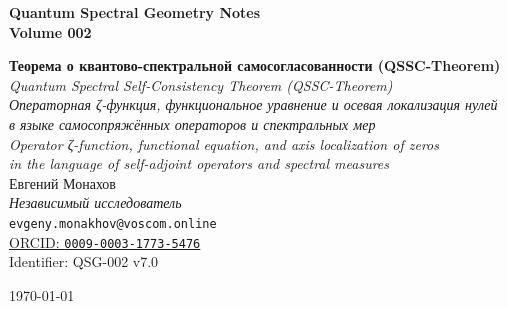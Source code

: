 \documentclass{article}
\numberwithin{equation}{section}
\theoremstyle{plain}
\theoremstyle{definition}
\theoremstyle{remark}
\begin{document}
    \sloppy

\begin{titlepage}
    \centering

    {\Large\textbf{Quantum Spectral Geometry Notes}}\\[4pt]
    {\large\textbf{Volume 002}}\\[16pt]
    
    \vspace*{\fill}

    {\Large\textbf{
    Теорема о квантово-спектральной самосогласованности (QSSC-Theorem)
    }}\\[12pt]

    {\large\textit{
    Quantum Spectral Self-Consistency Theorem (QSSC-Theorem)
    }}\\[20pt]

    {\normalsize\textit{
    Операторная ζ-функция, функциональное уравнение и осевая локализация нулей\\
    в языке самосопряжённых операторов и спектральных мер
    }}\\[8pt]

    {\footnotesize\textit{
    Operator ζ-function, functional equation, and axis localization of zeros\\
    in the language of self-adjoint operators and spectral measures
    }}\\[40pt]

    {\large Евгений Монахов}\\[6pt]
    {\itshape Независимый исследователь}\\[2pt]
    \texttt{evgeny.monakhov@voscom.online}\\[2pt]
    \href{https://orcid.org/0009-0003-1773-5476}{ORCID: \texttt{0009-0003-1773-5476}}\\[30pt]

    {\footnotesize Identifier: QSG-002 v7.0}\\[6pt]

    \vspace*{\fill}

    {\large \today}

\end{titlepage}

\clearpage
\tableofcontents


\clearpage
\end{document}
